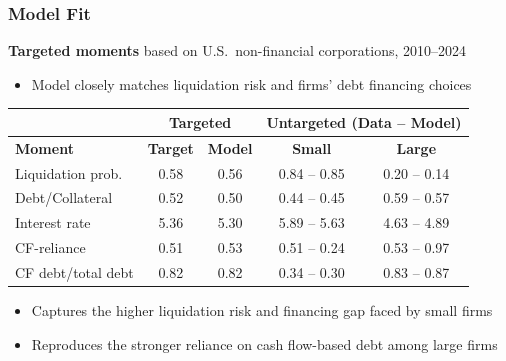 \documentclass[aspectratio=169,xcolor=table]{beamer}
\begin{document}
\begin{frame}[label=modelfit] \frametitle{Model Fit \hfill \hyperlink{effects}{}}

\textbf{Targeted moments} based on U.S.\ non-financial corporations, 2010--2024
\begin{itemize} \small
    \item Model closely matches liquidation risk and firms' debt financing choices
\end{itemize} \normalsize \vspace{1mm}

\footnotesize
\begin{table}[h!]
\centering
\renewcommand{\arraystretch}{0.85}
\begin{tabular}{l|cc||cc}
& \multicolumn{2}{c||}{\textbf{Targeted}} & \multicolumn{2}{c}{\textbf{Untargeted} (Data -- \textcolor{primary}{Model})} \\
\toprule
\textbf{Moment} & \textbf{Target} & \textbf{Model} & \textbf{Small} & \textbf{Large} \\
\midrule
Liquidation prob.   & 0.58 & \textcolor{primary}{0.56} & 0.84 -- \textcolor{primary}{0.85} & 0.20 -- \textcolor{primary}{0.14} \\
Debt/Collateral     & 0.52 & \textcolor{primary}{0.50} & 0.44 -- \textcolor{primary}{0.45} & 0.59 -- \textcolor{primary}{0.57} \\
Interest rate       & 5.36 & \textcolor{primary}{5.30} & 5.89 -- \textcolor{primary}{5.63} & 4.63 -- \textcolor{primary}{4.89} \\
CF-reliance         & 0.51 & \textcolor{primary}{0.53} & 0.51 -- \textcolor{primary}{0.24} & 0.53 -- \textcolor{primary}{0.97} \\
CF debt/total debt  & 0.82 & \textcolor{primary}{0.82} & 0.34 -- \textcolor{primary}{0.30} & 0.83 -- \textcolor{primary}{0.87} \\
\bottomrule
\end{tabular}
\label{tab:model_fit}
\end{table}
\normalsize \vspace{1mm}

\begin{itemize} \small
    \item Captures the higher liquidation risk and financing gap faced by small firms
    \item Reproduces the stronger reliance on cash flow-based debt among large firms
\end{itemize}

\end{frame}
\end{document}
